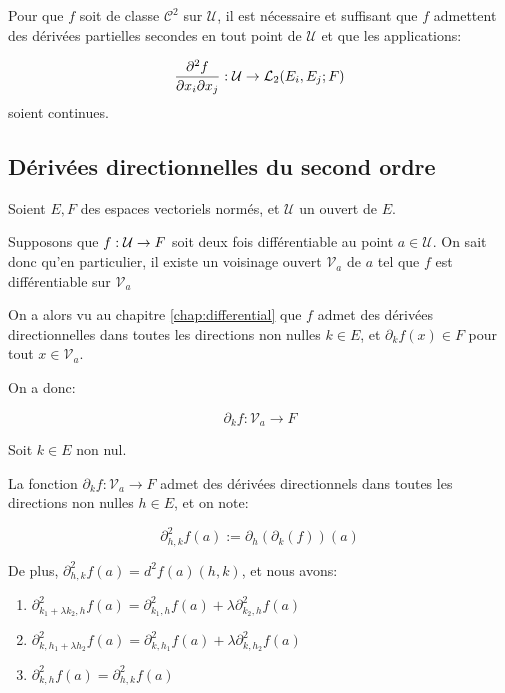 
\begin{proposition}
	Pour que $f$ soit de classe $\mathcal{C}^{2}$ sur $\mathcal{U}$, il est nécessaire et
	suffisant que $f$ admettent des dérivées partielles secondes en tout point
	de $\mathcal{U}$ et que les applications:

	\begin{equation}
		\pdv{f}{x_{i}}{x_{j}} (a) : \mathcal{U} \rightarrow
		\GScontinueHomo[2]{E_{i}, E_{j}}{F}
	\end{equation}
	soient continues.
\end{proposition}

\subsection{Dérivées directionnelles du second ordre}

Soient $E, F$ des espaces vectoriels normés, et $\mathcal{U}$ un ouvert de $E$.

Supposons que $\GSfunction{f}{\mathcal{U}}{F}$ soit deux fois différentiable au
point $a \in \mathcal{U}$.
On sait donc qu'en particulier, il existe un voisinage ouvert $\mathcal{V}_{a}$ de $a$ tel
que $f$ est différentiable sur $\mathcal{V}_{a}$

On a alors vu au chapitre \ref{chap:differential} que $f$ admet des
dérivées directionnelles dans toutes les directions non nulles $k \in E$, et
$\partial_{k}{f} (x) \in F$ pour tout $x \in \mathcal{V}_{a}$.

On a donc:

\begin{equation}
	\partial_{k}f : \mathcal{V}_{a} \rightarrow F
\end{equation}

\begin{proposition}
	Soit $k \in E$ non nul.

	La fonction $\partial_{k}f : \mathcal{V}_{a} \rightarrow F$ admet des
	dérivées directionnels dans toutes les directions non nulles $h \in E$, et
	on note:

	\begin{equation}
		\partial_{h, k}^{2} f (a) := \partial_{h} (\partial_{k}(f)) (a)
	\end{equation}

	De plus, $\partial_{h, k}^{2} f (a) = d^{2}f(a) (h, k)$, et nous avons:

	\begin{enumerate}
		\item $\partial_{k_{1} + \lambda k_{2}, h}^{2} f(a) =
			\partial_{k_{1}, h}^{2}f(a) + \lambda \partial_{k_{2}, h}^{2} f(a)$
		\item $\partial_{k, h_{1} + \lambda h_{2}}^{2} f(a) = \partial_{k,
				h_{1}}^{2} f(a) + \lambda \partial_{k, h_{2}}^{2} f(a)$
		\item $\partial_{k, h}^{2} f(a) = \partial_{h, k}^{2} f(a)$
	\end{enumerate}
\end{proposition}

